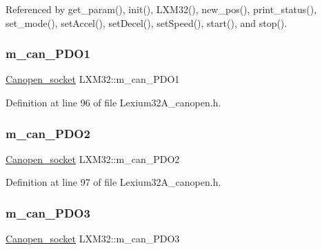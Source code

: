 Referenced by get\+\_\+param(), init(), L\+X\+M32(), new\+\_\+pos(), print\+\_\+status(), set\+\_\+mode(), set\+Accel(), set\+Decel(), set\+Speed(), start(), and stop().

\mbox{\label{class_l_x_m32_ae6fc61b6cbd9e5033b6503f8946ed9c5}} 
\subsubsection{\texorpdfstring{m\+\_\+can\+\_\+\+P\+D\+O1}{m\_can\_PDO1}}
{\footnotesize\ttfamily \hyperlink{class_canopen__socket}{Canopen\+\_\+socket} L\+X\+M32\+::m\+\_\+can\+\_\+\+P\+D\+O1\hspace{0.3cm}{\ttfamily [private]}}



Definition at line 96 of file Lexium32\+A\+\_\+canopen.\+h.

\mbox{\label{class_l_x_m32_a784c0204ddd0f063c4bcd243ac2533a1}} 
\subsubsection{\texorpdfstring{m\+\_\+can\+\_\+\+P\+D\+O2}{m\_can\_PDO2}}
{\footnotesize\ttfamily \hyperlink{class_canopen__socket}{Canopen\+\_\+socket} L\+X\+M32\+::m\+\_\+can\+\_\+\+P\+D\+O2\hspace{0.3cm}{\ttfamily [private]}}



Definition at line 97 of file Lexium32\+A\+\_\+canopen.\+h.

\mbox{\label{class_l_x_m32_a8e25c227aaf76a0dfd89a9936ad667bd}} 
\subsubsection{\texorpdfstring{m\+\_\+can\+\_\+\+P\+D\+O3}{m\_can\_PDO3}}
{\footnotesize\ttfamily \hyperlink{class_canopen__socket}{Canopen\+\_\+socket} L\+X\+M32\+::m\+\_\+can\+\_\+\+P\+D\+O3\hspace{0.3cm}{\ttfamily [private]}}



